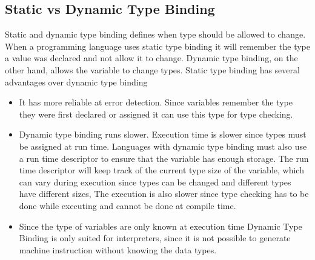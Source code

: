 \subsection{Static vs Dynamic Type Binding}
Static and dynamic type binding defines when type should be allowed to change. When a programming language uses static type binding it will remember the type a value was declared and not allow it to change. Dynamic type binding, on the other hand, allows the variable to change types\cite{conceptsOfProgrammingLanguages}.
Static type binding has several advantages over dynamic type binding
\begin{itemize}
    \item It has more reliable at error detection. Since variables remember the type they were first declared or assigned it can use this type for type checking. 
    \item Dynamic type binding runs slower. Execution time is slower since types must be assigned at run time. Languages with dynamic type binding must also use a run time descriptor to ensure that the variable has enough storage. The run time descriptor will keep track of the current type size of the variable, which can vary during execution since types can be changed and different types have different sizes, The execution is also slower since type checking has to be done while executing and cannot be done at compile time\cite{conceptsOfProgrammingLanguages}.
    \item Since the type of variables are only known at execution time Dynamic Type Binding is only suited for interpreters, since it is not possible to generate machine instruction without knowing the data types.
\end{itemize}
